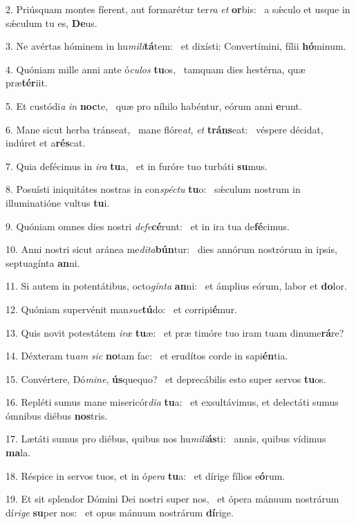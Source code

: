 2. Priúsquam montes fíerent, aut formarétur ter\textit{ra} \textit{et} \textbf{or}bis: \ast\  a sǽculo et usque in sǽculum tu es, \textbf{De}us.\

3. Ne avértas hóminem in hu\textit{mi}\textit{li}\textbf{tá}tem: \ast\  et dixísti: Convertímini, fílii \textbf{hó}minum.\

4. Quóniam mille anni ante ó\textit{cu}\textit{los} \textbf{tu}os, \ast\  tamquam dies hestérna, quæ præ\textbf{tér}iit.\

5. Et custódi\textit{a} \textit{in} \textbf{noc}te, \ast\  quæ pro níhilo habéntur, eórum anni \textbf{e}runt.\

6. Mane sicut herba tránseat, \dag\  mane flóre\textit{at}, \textit{et} \textbf{tráns}eat: \ast\  véspere décidat, indúret et a\textbf{rés}cat.\

7. Quia defécimus in \textit{i}\textit{ra} \textbf{tu}a, \ast\  et in furóre tuo turbáti \textbf{su}mus.\

8. Posuísti iniquitátes nostras in con\textit{spéc}\textit{tu} \textbf{tu}o: \ast\  sǽculum nostrum in illuminatióne vultus \textbf{tu}i.\

9. Quóniam omnes dies nostri \textit{de}\textit{fe}\textbf{cé}runt: \ast\  et in ira tua de\textbf{fé}cimus.\

10. Anni nostri sicut aránea me\textit{di}\textit{ta}\textbf{bún}tur: \ast\  dies annórum nostrórum in ipsis, septuagínta \textbf{an}ni.\

11. Si autem in potentátibus, octo\textit{gín}\textit{ta} \textbf{an}ni: \ast\  et ámplius eórum, labor et \textbf{do}lor.\

12. Quóniam supervénit man\textit{su}\textit{e}\textbf{tú}do: \ast\  et corripi\textbf{é}mur.\

13. Quis novit potestátem \textit{i}\textit{ræ} \textbf{tu}æ: \ast\  et præ timóre tuo iram tuam dinume\textbf{rá}re?\

14. Déxteram tu\textit{am} \textit{sic} \textbf{no}tam fac: \ast\  et erudítos corde in sapi\textbf{én}tia.\

15. Convértere, Dó\textit{mi}\textit{ne}, \textbf{ús}quequo? \ast\  et deprecábilis esto super servos \textbf{tu}os.\

16. Repléti sumus mane misericór\textit{di}\textit{a} \textbf{tu}a: \ast\  et exsultávimus, et delectáti sumus ómnibus diébus \textbf{nos}tris.\

17. Lætáti sumus pro diébus, quibus nos hu\textit{mi}\textit{li}\textbf{ás}ti: \ast\  annis, quibus vídimus \textbf{ma}la.\

18. Réspice in servos tuos, et in ó\textit{pe}\textit{ra} \textbf{tu}a: \ast\  et dírige fílios e\textbf{ó}rum.\

19. Et sit splendor Dómini Dei nostri super nos, \dag\  et ópera mánuum nostrárum dí\textit{ri}\textit{ge} \textbf{su}per nos: \ast\  et opus mánuum nostrárum \textbf{dí}rige.\

